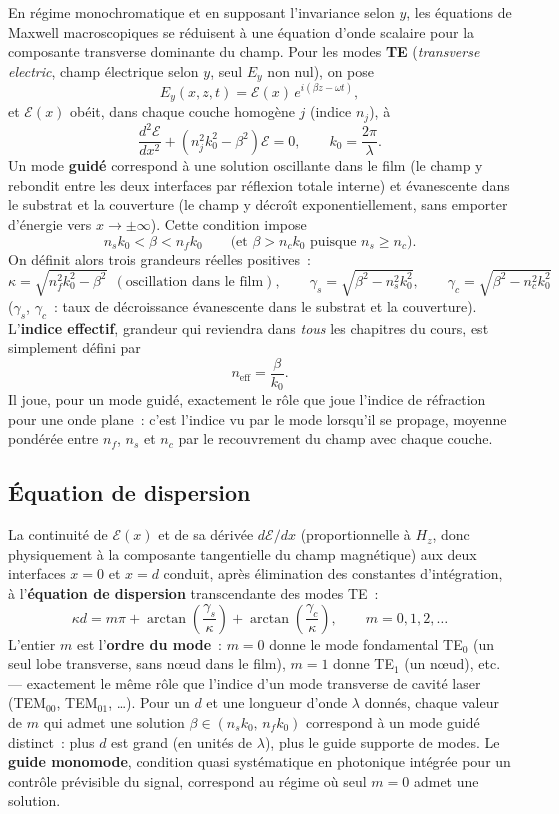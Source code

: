 En régime monochromatique et en supposant l'invariance selon $y$, les
équations de Maxwell macroscopiques se réduisent à une équation d'onde
scalaire pour la composante transverse dominante du champ. Pour les modes
\textbf{TE} (\emph{transverse electric}, champ électrique selon $y$, seul
$E_y$ non nul), on pose
\[
  E_y(x,z,t) = \mathcal{E}(x)\, e^{i(\beta z - \omega t)},
\]
et $\mathcal{E}(x)$ obéit, dans chaque couche homogène $j$ (indice $n_j$), à
\[
  \frac{d^2\mathcal{E}}{dx^2} + \left(n_j^2 k_0^2 - \beta^2\right)\mathcal{E} = 0,
  \qquad k_0 = \frac{2\pi}{\lambda}.
\]
Un mode \textbf{guidé} correspond à une solution oscillante dans le film
(le champ y \og rebondit\fg{} entre les deux interfaces par réflexion totale
interne) et évanescente dans le substrat et la couverture (le champ y
décroît exponentiellement, sans emporter d'énergie vers $x\to\pm\infty$).
Cette condition impose
\[
  n_s k_0 < \beta < n_f k_0 \qquad \text{(et } \beta > n_c k_0\text{ puisque } n_s \geq n_c\text{)}.
\]
On définit alors trois grandeurs réelles positives~:
\[
  \kappa = \sqrt{n_f^2 k_0^2 - \beta^2} \ \ (\text{oscillation dans le film}), \qquad
  \gamma_s = \sqrt{\beta^2 - n_s^2 k_0^2}, \qquad
  \gamma_c = \sqrt{\beta^2 - n_c^2 k_0^2}
\]
($\gamma_s$, $\gamma_c$~: taux de décroissance évanescente dans le substrat
et la couverture). L'\textbf{indice effectif}, grandeur qui reviendra dans
\emph{tous} les chapitres du cours, est simplement défini par
\[
  \boxed{n_{\text{eff}} = \frac{\beta}{k_0}}.
\]
Il joue, pour un mode guidé, exactement le rôle que joue l'indice de
réfraction pour une onde plane~: c'est l'indice \og vu\fg{} par le mode
lorsqu'il se propage, moyenne pondérée entre $n_f$, $n_s$ et $n_c$ par le
recouvrement du champ avec chaque couche.

\subsection{Équation de dispersion}

La continuité de $\mathcal{E}(x)$ et de sa dérivée $d\mathcal{E}/dx$
(proportionnelle à $H_z$, donc physiquement à la composante tangentielle du
champ magnétique) aux deux interfaces $x=0$ et $x=d$ conduit, après
élimination des constantes d'intégration, à l'\textbf{équation de
dispersion} transcendante des modes TE~:
\[
  \boxed{\kappa d = m\pi + \arctan\!\left(\frac{\gamma_s}{\kappa}\right) + \arctan\!\left(\frac{\gamma_c}{\kappa}\right)}, \qquad m = 0,1,2,\dots
\]
L'entier $m$ est l'\textbf{ordre du mode}~: $m=0$ donne le mode fondamental
TE$_0$ (un seul lobe transverse, sans nœud dans le film), $m=1$ donne
TE$_1$ (un nœud), etc. — exactement le même rôle que l'indice d'un mode
transverse de cavité laser (TEM$_{00}$, TEM$_{01}$, \dots). Pour un $d$ et
une longueur d'onde $\lambda$ donnés, chaque valeur de $m$ qui admet une
solution $\beta \in (n_s k_0,\, n_f k_0)$ correspond à un mode guidé
distinct~: plus $d$ est grand (en unités de $\lambda$), plus le guide
supporte de modes. Le \textbf{guide monomode}, condition quasi systématique
en photonique intégrée pour un contrôle prévisible du signal, correspond au
régime où seul $m=0$ admet une solution.

